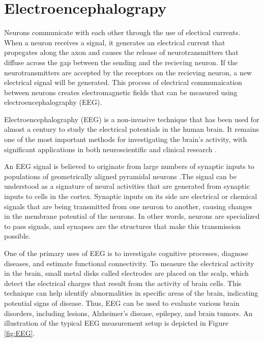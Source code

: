 \documentclass[a4paper, UKenglish, 11pt]{uiomaster}
\begin{document}

\chapter{Electroencephalograpy}
Neurons communicate with each other through the use of electical currents. When a neuron receives a signal, it generates an electrical current that propegates along the axon and causes the release of neurotransmitters that diffuse across the gap between the sending and the recieving neuron. If the neurotransmitters are accepted by the receptors on the recieving neuron, a new electrical signal will be generated. This process of electrical communaication between neurons creates electromagnetic fields that can be measured using electroencephalography (EEG).

Electroencephalography (EEG) is a non-invasive technique that has been used for almost a century to study the electrical potentials in the human brain. It remains one of the most important methods for investigating the brain's activity, with significant applications in both neuroscientific and clinical research \cite{ilmoniemi2019brain}.

An EEG signal is believed to originate from large numbers of synaptic inputs to populations of geometrically aligned pyramidal neurons \cite{nunez2006electric}.The signal can be understood as a signature of neural activities that are generated from synaptic inputs to cells in the cortex. Synaptic inputs on its side are electrical or chemical signals that are being transmitted from one neuron to another, causing changes in the membrane potential of the neurons. In other words, neurons are specialized to pass signals, and synapses are the structures that make this transmission possible.

One of the primary uses of EEG is to investigate cognitive processes, diagnose diseases, and estimate functional connectivity. To measure the electrical activity in the brain, small metal disks called electrodes are placed on the scalp, which detect the electrical charges that result from the activity of brain cells. This technique can help identify abnormalities in specific areas of the brain, indicating potential signs of disease. Thus, EEG can be used to evaluate various brain disorders, including lesions, Alzheimer's disease, epilepsy, and brain tumors. An illustration of the typical EEG measurement setup is depicted in Figure \ref{fig:EEG}.
\end{document}
